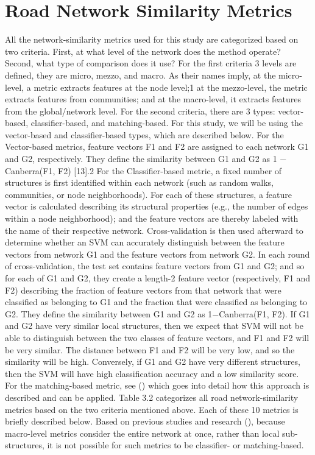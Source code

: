 \section{Road Network Similarity Metrics}
All the network-similarity metrics used for this study are categorized based on two criteria. First, at what level of the network does the method operate? Second, what type of comparison does it use? For the first criteria 3 levels are defined, they are micro, mezzo, and macro. As their names imply, at the micro-level, a metric extracts features at the node level;1 at the mezzo-level, the metric extracts features from communities; and at the macro-level, it extracts features from the global/network level.  For the second criteria, there are 3 types: vector-based, classifier-based, and matching-based. For this study, we will be using the vector-based and classifier-based types, which are described below. For the Vector-based metrics, feature vectors F1 and F2 are assigned to each network G1 and G2, respectively. They define the similarity between G1 and G2 as 1 − Canberra(F1, F2) [13].2 For the Classifier-based metric,  a fixed number of structures is first identified within each network (such as random walks, communities, or node neighborhoods). For each of these structures, a feature vector is calculated describing its structural properties (e.g., the number of edges within a node neighborhood); and the feature vectors are thereby labeled with the name of their respective network. Cross-validation is then used afterward to determine whether an SVM can accurately distinguish between the feature vectors from network G1 and the feature vectors from network G2. In each round of cross-validation, the test set contains feature vectors from G1 and G2; and so for each of G1 and G2, they create a length-2 feature vector (respectively, F1 and F2) describing the fraction of feature vectors from that network that were classified as belonging to G1 and the fraction that were classified as belonging to G2. They define the similarity between G1 and G2 as 1−Canberra(F1, F2). If G1 and G2 have very similar local structures, then we expect that SVM will not be able to distinguish between the two classes of feature vectors, and F1 and F2 will be very similar. The distance between F1 and F2 will be very low, and so the similarity will be high. Conversely, if G1 and G2 have very different structures, then the SVM will have high classification accuracy and a low similarity score. For the matching-based metric, see () which goes into detail how this approach is described and can be applied. Table 3.2 categorizes all road network-similarity metrics
based on the two criteria mentioned above. Each of these 10 metrics is briefly described below. Based on previous studies and research (), because macro-level metrics consider the entire network at once, rather than local sub-structures, it is not possible for such metrics to be classifier- or matching-based.

